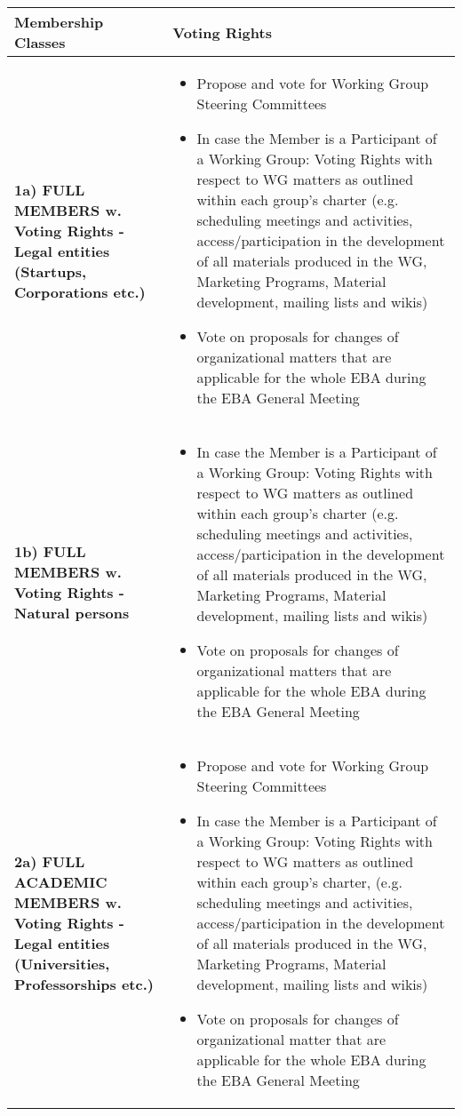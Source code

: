 \documentclass{article}
\begin{document}
\begin{longtable}{| p{} | p{} |}

	\hline
    \textbf{Membership Classes} & \textbf{Voting Rights} \\ \hline\hline
    \textbf{1a) FULL MEMBERS w. Voting Rights  - Legal entities (Startups, Corporations etc.)} & 
    
   	\begin{itemize}
   		\item Propose and vote for Working Group Steering Committees
   		\item In case the Member is a Participant of a Working Group: Voting Rights with respect to WG matters as outlined within each group's charter (e.g. scheduling meetings and activities, access/participation in the development of all materials produced in the WG, Marketing Programs, Material development, mailing lists and wikis)
   		\item Vote on proposals for changes of organizational matters that are applicable for the whole EBA during the EBA General Meeting
   	\end{itemize}\\ \hline
    	
   	\textbf{1b) FULL MEMBERS w. Voting Rights - Natural persons} & 
   	\begin{itemize}
   		\item In case the Member is a Participant of a Working Group: Voting Rights with respect to WG matters as outlined within each group's charter (e.g. scheduling meetings and activities, access/participation in the development of all materials produced in the WG, Marketing Programs, Material development, mailing lists and wikis)
   		\item Vote on proposals for changes of organizational matters that are applicable for the whole EBA during the EBA General Meeting
   	\end{itemize}\\ \hline
    	
   	\textbf{2a) FULL ACADEMIC MEMBERS w. Voting Rights - Legal entities (Universities, Professorships etc.)} & 
   	\begin{itemize}
   		\item Propose and vote for Working Group Steering Committees
   		\item In case the Member is a Participant of a Working Group: Voting Rights with respect to WG matters as outlined within each group's charter, (e.g. scheduling meetings and activities, access/participation in the development of all materials produced in the WG, Marketing Programs, Material development, mailing lists and wikis)
   		\item Vote on proposals for changes of organizational matter that are applicable for the whole EBA during the EBA General Meeting
   	\end{itemize}\\ \hline
    	

\end{longtable}
\end{document}
